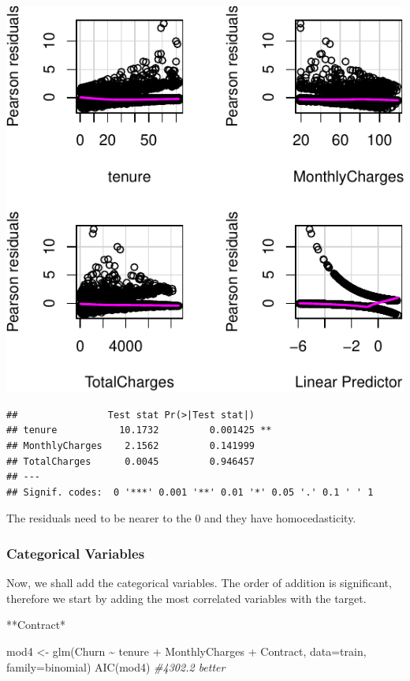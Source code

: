 \documentclass[
  twoside]{article}
\newenvironment{Shaded}{\begin{snugshade}}{\end{snugshade}}
\newcommand{\AttributeTok}[1]{\textcolor[rgb]{0.77,0.63,0.00}{#1}}
\newcommand{\CommentTok}[1]{\textcolor[rgb]{0.56,0.35,0.01}{\textit{#1}}}
\newcommand{\FunctionTok}[1]{\textcolor[rgb]{0.00,0.00,0.00}{#1}}
\newcommand{\NormalTok}[1]{#1}
\newcommand{\OtherTok}[1]{\textcolor[rgb]{0.56,0.35,0.01}{#1}}
\newcommand{\SpecialCharTok}[1]{\textcolor[rgb]{0.00,0.00,0.00}{#1}}
\begin{document}
\includegraphics{Assigment2_files/figure-latex/unnamed-chunk-54-1.pdf}

\begin{verbatim}
##                Test stat Pr(>|Test stat|)   
## tenure           10.1732         0.001425 **
## MonthlyCharges    2.1562         0.141999   
## TotalCharges      0.0045         0.946457   
## ---
## Signif. codes:  0 '***' 0.001 '**' 0.01 '*' 0.05 '.' 0.1 ' ' 1
\end{verbatim}

The residuals need to be nearer to the 0 and they have homocedasticity.

\hypertarget{categorical-variables}{%
\subsubsection{Categorical Variables}\label{categorical-variables}}

Now, we shall add the categorical variables. The order of addition is
significant, therefore we start by adding the most correlated variables
with the target.

**Contract*

\begin{Shaded}
\begin{Highlighting}[]
\NormalTok{mod4 }\OtherTok{\textless{}{-}} \FunctionTok{glm}\NormalTok{(Churn }\SpecialCharTok{\textasciitilde{}}\NormalTok{ tenure }\SpecialCharTok{+}\NormalTok{ MonthlyCharges }\SpecialCharTok{+}\NormalTok{ Contract, }\AttributeTok{data=}\NormalTok{train, }\AttributeTok{family=}\NormalTok{binomial)}
\FunctionTok{AIC}\NormalTok{(mod4) }\CommentTok{\#4302.2 better}
\end{Highlighting}
\end{Shaded}
\end{document}
